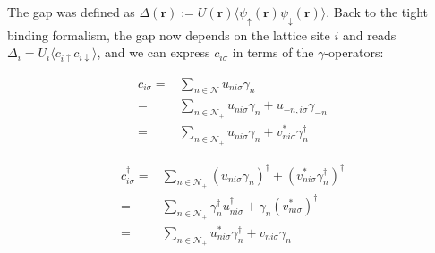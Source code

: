 \documentclass[../main.tex]{subfile}
\begin{document}
The gap was defined as $\Delta(\bm{r}) := U(\bm{r}) \langle \psi_{\uparrow}(\bm{r})\psi_{\downarrow}(\bm{r})\rangle$. Back to the tight binding formalism,
the gap now depends on the lattice site $i$ and reads
$\Delta_i = U_i\langle c_{i\uparrow}c_{i\downarrow}\rangle$, and we can express $c_{i\sigma}$ in terms of the $\gamma$-operators:
\begin{center}
\begin{minipage}{0.4\textwidth}
\begin{equation}
    \begin{aligned}\label{eq:BdG_transf_c}
    c_{i\sigma} =& \sum_{n\in\mathcal{N}} u_{ni\sigma}\gamma_n \\
        =& \sum_{n\in\mathcal{N}_+} u_{ni\sigma}\gamma_n + u_{-n,i\sigma}\gamma_{-n}\\
        =& \sum_{n\in\mathcal{N}_+} u_{ni\sigma}\gamma_n + v_{ni\sigma}^{\ast}\gamma_{n}^{\dagger}
    \end{aligned}
\end{equation}
\end{minipage}\hspace{0.05\textwidth}
\begin{minipage}{0.03\textwidth}
\end{minipage}
\begin{minipage}{0.45\textwidth}
    \begin{equation}
        \begin{aligned}\label{eq:BdG_transf_c_dagg}
        c_{i\sigma}^{\dagger} =& \sum_{n\in\mathcal{N}_+}( u_{ni\sigma}\gamma_n)^{\dagger} +( v_{ni\sigma}^{\ast}\gamma_{n}^{\dagger})^{\dagger} \\
            =& \sum_{n\in\mathcal{N}_+} \gamma_n^{\dagger}u_{ni\sigma}^{\dagger} + \gamma_{n}(v_{ni\sigma}^{\ast})^{\dagger} \\
            =& \sum_{n\in\mathcal{N}_+} u_{ni\sigma}^{\ast}\gamma_n^{\dagger} + v_{ni\sigma}\gamma_{n} \\
        \end{aligned}
    \end{equation}
\end{minipage}
\end{center}
\end{document}
